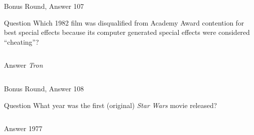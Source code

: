 \documentclass[11pt]{beamer}
\begin{document}
\begin{frame}[t]{Bonus Round, Answer 107}
\vspace{2em}
\begin{block}{Question}
Which 1982 film was disqualified from Academy Award contention for best special effects because its computer generated special effects were considered ``cheating''?
\end{block}
\pause{}
\begin{columns}[T,totalwidth=\linewidth]
\begin{column}{0.35\linewidth}
\begin{block}{Answer}
\emph{Tron}
\end{block}
\end{column}
\begin{column}{0.6\linewidth}
\begin{center}
\texttt{[image: \{Images/tron]}.jpg}
\end{center}
\end{column}
\end{columns}
\end{frame}
    

\begin{frame}[t]{Bonus Round, Answer 108}
\vspace{2em}
\begin{block}{Question}
What year was the first (original) \emph{Star Wars} movie released?
\end{block}
\pause{}
\begin{columns}[T,totalwidth=\linewidth]
\begin{column}{0.35\linewidth}
\begin{block}{Answer}
1977
\end{block}
\end{column}
\begin{column}{0.6\linewidth}
\begin{center}
\texttt{[image: \{Images/starwars]}.jpg}
\end{center}
\end{column}
\end{columns}
\end{frame}
    
\end{document}
